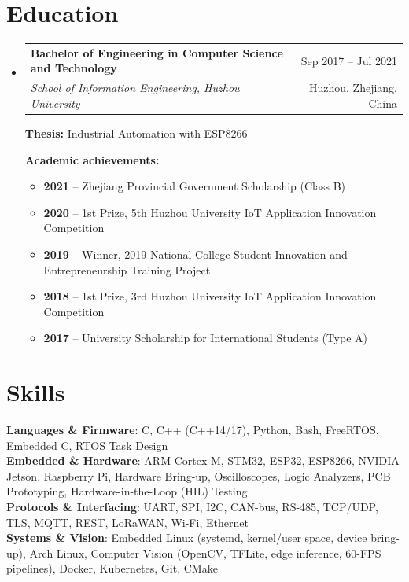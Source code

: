 \documentclass[a4paper,11pt]{article}
\makeatletter
\newcommand{\resumeSubheading}[4]{
  \vspace{-1pt}
\item
  \begin{tabular*}{\linewidth}{@{}l@{\extracolsep{\fill}}r@{}}
    \textbf{\color{textcolor}#1} & {\small #4} \\
    {\small\color{accentcolor}\textit{#3}} & {\small #2}
  \end{tabular*}\vspace{-3pt}
}
\newcommand{\resumeSubHeadingListStart}{
\begin{itemize}[leftmargin=*,itemsep=2pt,topsep=1pt,parsep=0pt]}
\newcommand{\resumeSubHeadingListEnd}{
\end{itemize}}
\makeatother
\begin{document}
\section{Education}
\resumeSubHeadingListStart
\resumeSubheading
{Bachelor of Engineering in Computer Science and Technology}{Huzhou, Zhejiang, China}
{School of Information Engineering, Huzhou University}{Sep 2017 -- Jul 2021}
{\small\textbf{Thesis:} Industrial Automation with ESP8266}\par
\vspace{2pt}
{\small\textbf{Academic achievements:}}
\begin{itemize}[leftmargin=*,itemsep=1pt,topsep=1pt,parsep=0pt]
  \item\small{\textbf{2021} -- Zhejiang Provincial Government Scholarship (Class B)}
  \item\small{\textbf{2020} -- 1st Prize, 5th Huzhou University IoT Application Innovation Competition}
  \item\small{\textbf{2019} -- Winner, 2019 National College Student Innovation and Entrepreneurship Training Project}
  \item\small{\textbf{2018} -- 1st Prize, 3rd Huzhou University IoT Application Innovation Competition}
  \item\small{\textbf{2017} -- University Scholarship for International Students (Type A)}
\end{itemize}
\resumeSubHeadingListEnd

\section{Skills}
\begin{itemize}[leftmargin=*,label={}]
    \small{
    \item{
        \textbf{Languages \& Firmware}: C, C++ (C++14/17), Python, Bash, FreeRTOS, Embedded C, RTOS Task Design \\
        \textbf{Embedded \& Hardware}: ARM Cortex-M, STM32, ESP32, ESP8266, NVIDIA Jetson, Raspberry Pi, Hardware Bring-up, Oscilloscopes, Logic Analyzers, PCB Prototyping, Hardware-in-the-Loop (HIL) Testing \\
        \textbf{Protocols \& Interfacing}: UART, SPI, I2C, CAN-bus, RS-485, TCP/UDP, TLS, MQTT, REST, LoRaWAN, Wi-Fi, Ethernet \\
        \textbf{Systems \& Vision}: Embedded Linux (systemd, kernel/user space, device bring-up), Arch Linux, Computer Vision (OpenCV, TFLite, edge inference, 60-FPS pipelines), Docker, Kubernetes, Git, CMake
    }}
\end{itemize}
\end{document}
